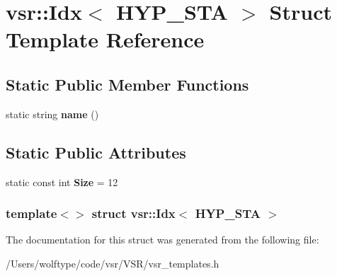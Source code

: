 \hypertarget{structvsr_1_1_idx_3_01_h_y_p___s_t_a_01_4}{\section{vsr\-:\-:Idx$<$ H\-Y\-P\-\_\-\-S\-T\-A $>$ Struct Template Reference}
\label{structvsr_1_1_idx_3_01_h_y_p___s_t_a_01_4}
}
\subsection*{Static Public Member Functions}
\begin{DoxyCompactItemize}
\item 
\hypertarget{structvsr_1_1_idx_3_01_h_y_p___s_t_a_01_4_a40f88bf6da4229a212d9b232595c439e}{static string {\bfseries name} ()}\label{structvsr_1_1_idx_3_01_h_y_p___s_t_a_01_4_a40f88bf6da4229a212d9b232595c439e}

\end{DoxyCompactItemize}
\subsection*{Static Public Attributes}
\begin{DoxyCompactItemize}
\item 
\hypertarget{structvsr_1_1_idx_3_01_h_y_p___s_t_a_01_4_a2ffbd0a5276957b73f779d26b7a00520}{static const int {\bfseries Size} = 12}\label{structvsr_1_1_idx_3_01_h_y_p___s_t_a_01_4_a2ffbd0a5276957b73f779d26b7a00520}

\end{DoxyCompactItemize}
\subsubsection*{template$<$$>$ struct vsr\-::\-Idx$<$ H\-Y\-P\-\_\-\-S\-T\-A $>$}



The documentation for this struct was generated from the following file\-:\begin{DoxyCompactItemize}
\item 
/\-Users/wolftype/code/vsr/\-V\-S\-R/vsr\-\_\-templates.\-h\end{DoxyCompactItemize}
